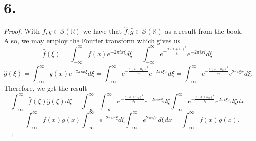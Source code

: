 \documentclass{article}
\begin{document}
\section*{6.}
\begin{proof}
With $f, g \in \mathcal{S}(\mathbb{R})$ we have that $\hat{f}, \hat{g} \in \mathcal{S}(\mathbb{R})$ as a result from the book. Also, we may employ the Fourier transform which gives us 
\[
 \hat{f}(\xi) = \int_{-\infty}^{\infty}f(x)e^{-2 \pi i x \xi}d\xi = \int_{-\infty}^{\infty} e^{-\frac{\pi(x + n_1)^2}{\delta_1}}e^{-2 \pi ix \xi}d\xi
\]
\[
 \overline{\hat{g}(\xi)} = \overline{\int_{-\infty}^{\infty} g(x)e^{-2 \pi i x \xi}d\xi} = \overline{\int_{-\infty}^{\infty}e^{-\frac{\pi(x + n_2)^2}{\delta_2}}e^{-2 \pi i \xi x}d\xi} = \int_{-\infty}^{\infty}e^{-\frac{\pi(x + n_2)^2}{\delta_2}}e^{2 \pi i \xi x}d\xi.
\]
Therefore, we get the result
\[
 \int_{-\infty}^{\infty}\hat{f}(\xi)\hat{g}(\xi)d \xi= \int_{-\infty}^{\infty} \int_{-\infty}^{\infty} e^{-\frac{\pi(x + n_1)^2}{\delta_1}}e^{-2 \pi ix \xi}d\xi \int_{-\infty}^{\infty}e^{-\frac{\pi(x + n_2)^2}{\delta_2}}e^{2 \pi i \xi x}d\xi dx\]\[ = \int_{-\infty}^{\infty}f(x)g(x)\int_{-\infty}^{\infty}e^{-2 \pi ix \xi}d\xi\int_{-\infty}^{\infty}e^{2 \pi i \xi x} d \xi dx = \int_{-\infty}^{\infty}f(x)g(x).\]

\end{proof}
\end{document}

